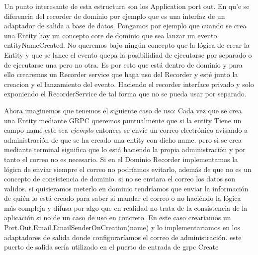 Un punto interesante de esta estructura son los Application port out. En qu'e se diferencia del recorder de dominio por ejemplo que es una interfaz de un adaptador de salida a base de datos. Pongamos por ejemplo que cuando se crea una Entity hay un concepto core de dominio que sea lanzar un evento entityNameCreated. No queremos bajo ningún concepto que la lógica de crear la Entity y que se lance el evento quepa la posibilidiad de ejecutarse por separado o de ejecutarse una pero no otra. Es por esto que está dentro de dominio y para ello crearemos un Recorder service que haga uso del Recorder y esté junto la creacion y el lanzamiento del evento. Haciendo el recorder interface privado y solo exponiendo el RecorderService de tal forma que no se pueda usar por separado.

Ahora imaginemos que tenemos el siguiente caso de uso:
Cada vez que se crea una Entity mediante GRPC queremos puntualmente que si la entity Tiene un campo name este sea \textit{ejemplo} entonces se envíe un correo electrónico avisando a administración de que se ha creado una entity con dicho name.
pero si se crea mediante terminal significa que lo está haciendo la propia administración y por tanto el correo no es necesario. Si en el Dominio Recorder implementamos la lógica de enviar siempre el correo no podríamos evitarlo, además de que no es un concepto de consistencia de dominio. si no se enviara el correo los datos son validos. si quisieramos meterlo en dominio tendríamos que enviar la información de quién lo está creado para saber si mandar el correo o no haciéndo la lógica más compleja y difusa por algo que en realidad no trata de la consistencia de la aplicación si no de un caso de uso en concreto. En este caso creariamos un Port.Out.Email.EmailSenderOnCreation(name) y lo implementariamos en los adaptadores de salida donde configuraríamos el correo de administración. este puerto de salida sería utilizado en el puerto de entrada de grpc Create

\begin{figure}[H]
    
    \caption{}
    \label{fig:ProjectfolderStructurePortOut}
\end{figure}